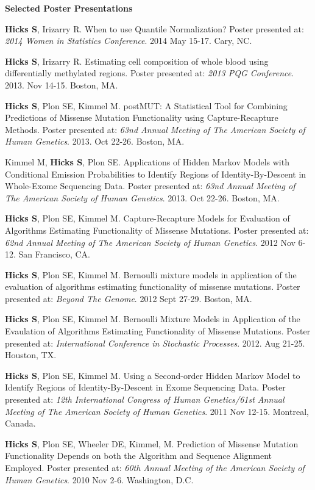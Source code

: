 \documentclass[10pt]{article}
\begin{document}
\textbf{Selected Poster Presentations} 
\begin{enumerate}[label= {[\arabic*]}]
\item {\bf Hicks S}, Irizarry R. When to use Quantile Normalization? Poster presented at: \emph{2014 Women in Statistics Conference}. 2014 May 15-17. Cary, NC.
\item {\bf Hicks S}, Irizarry R. Estimating cell composition of whole blood using differentially methylated regions. Poster presented at: \emph{2013 PQG Conference}. 2013. Nov 14-15. Boston, MA. 
\item {\bf Hicks S}, Plon SE, Kimmel M. postMUT: A Statistical Tool for Combining Predictions of Missense Mutation Functionality using Capture-Recapture Methods. Poster presented at: \emph{63nd Annual Meeting of The American Society of Human Genetics}. 2013. Oct 22-26. Boston, MA.
\item Kimmel M, {\bf Hicks S}, Plon SE. Applications of Hidden Markov Models with Conditional Emission Probabilities to Identify Regions of Identity-By-Descent in Whole-Exome Sequencing Data. Poster presented at: \emph{63nd Annual Meeting of The American Society of Human Genetics}. 2013. Oct 22-26. Boston, MA.
\item {\bf Hicks S}, Plon SE, Kimmel M. Capture-Recapture Models for Evaluation of Algorithms Estimating Functionality of Missense Mutations. Poster presented at: \emph{62nd Annual Meeting of The American Society of Human Genetics}. 2012 Nov 6-12. San Francisco, CA. %
\item {\bf Hicks S}, Plon SE, Kimmel M. Bernoulli mixture models in application of the evaluation of algorithms estimating functionality of missense mutations. Poster presented at: \emph{Beyond The Genome}. 2012 Sept 27-29. Boston, MA.
\item {\bf Hicks S}, Plon SE, Kimmel M. Bernoulli Mixture Models in Application of the Evaulation of Algorithms Estimating Functionality of Missense Mutations. Poster presented at: \emph{International Conference in Stochastic Processes}. 2012. Aug 21-25. Houston, TX. 
\item {\bf Hicks S}, Plon SE, Kimmel M. Using a Second-order Hidden Markov Model to Identify Regions of Identity-By-Descent in Exome Sequencing Data. Poster presented at: \emph{12th International Congress of Human Genetics/61st Annual Meeting of The American Society of Human Genetics}. 2011 Nov 12-15. Montreal, Canada.
\item {\bf Hicks S}, Plon SE, Wheeler DE, Kimmel, M. Prediction of Missense Mutation Functionality Depends on both the Algorithm and Sequence Alignment Employed. Poster presented at: \emph{60th Annual Meeting of the American Society of Human Genetics}. 2010 Nov 2-6. Washington, D.C.

\end{enumerate}
\end{document}
